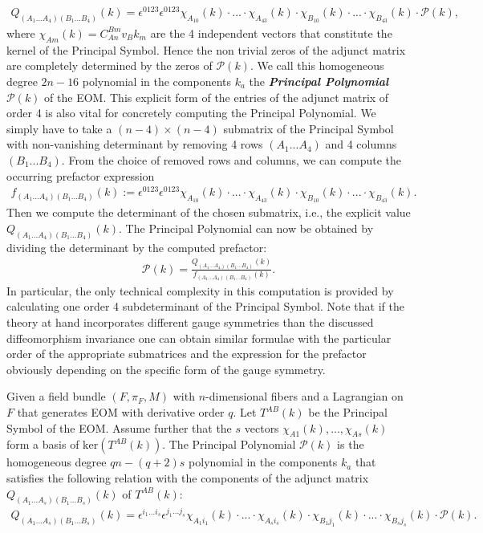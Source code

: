 \begin{align}\label{diffeoMinor}
    Q_{(A_1...A_4) (B_1...B_4)}(k) = \epsilon^{0123} \epsilon^{0123} \chi_{A_10}(k) \cdot ... \cdot \chi_{A_43}(k) \cdot \chi_{B_10}(k) \cdot ... \cdot \chi_{B_43}(k) \cdot \mathcal{P}(k),
\end{align}
% 
%
%
%
where $\chi_{Am}(k) = C^{Bm}_{An} v_B k_m$ are the 4 independent vectors that constitute the kernel of the Principal Symbol. Hence the non trivial zeros of the adjunct matrix are completely determined by the zeros of $\mathcal{P}(k)$. We call this homogeneous degree $2n-16$ polynomial in the components $k_a$ the \textit{\textbf{Principal Polynomial}}  $\mathcal{P}(k)$ of the EOM.
This explicit form of the entries of the adjunct matrix of order 4 is also vital for concretely computing the Principal Polynomial. We simply have to take a $(n-4) \times (n-4)$ submatrix of the Principal Symbol with non-vanishing determinant by removing 4 rows $(A_1...A_4)$ and 4 columns $(B_1...B_4)$. From the choice of removed rows and columns, we can compute the occurring prefactor expression 
\begin{align}\label{prefacF}
f_{(A_1...A_4)(B_1...B_4)}(k) := \epsilon^{0123} \epsilon^{0123} \chi_{A_10}(k) \cdot ... \cdot \chi_{A_43}(k) \cdot \chi_{B_10}(k) \cdot ... \cdot \chi_{B_43}(k).
\end{align}
Then we compute the determinant of the chosen submatrix, i.e., the explicit value $Q_{(A_1...A_4)(B_1...B_4)}(k)$. The Principal Polynomial can now be obtained by dividing the determinant by the computed prefactor:
\begin{align}
    \mathcal{P}(k) = \frac{Q_{(A_1...A_4)(B_1...B_4)}(k)}{f_{(A_1...A_4)(B_1...B_4)}(k)}.
\end{align}
In particular, the only technical complexity in this computation is provided by calculating one order 4 subdeterminant of the Principal Symbol. 
Note that if the theory at hand incorporates different gauge symmetries than the discussed diffeomorphism invariance one can obtain similar formulae with the particular order of the appropriate submatrices and the expression for the prefactor obviously depending on the specific form of the gauge symmetry.
\begin{definition}
Given a field bundle $(F,\pi_F,M)$ with $n$-dimensional fibers and a Lagrangian on $F$ that generates EOM with derivative order $q$. Let  $T^{AB}(k)$ be the Principal Symbol of the EOM. Assume further that the $s$ vectors $\chi_{A1}(k),...,\chi_{As}(k)$ form a basis of $\mathrm{ker}(T^{AB}(k))$. The Principal Polynomial $\mathcal{P}(k)$
is the homogeneous degree $qn - (q+2)s$ polynomial in the components $k_a$ that satisfies the following relation with the components of the adjunct matrix $Q_{(A_1...A_s)(B_1...B_s)}(k)$ of $T^{AB}(k)$:
\begin{align}
   Q_{(A_1...A_s)(B_1...B_s)}(k) = \epsilon^{i_1...i_s} \epsilon^{j_1...j_s} \chi_{A_1i_1}(k)\cdot ... \cdot \chi_{A_si_s}(k) \cdot \chi_{B_1j_1}(k) \cdot ... \cdot \chi_{B_sj_s}(k) \cdot \mathcal{P}(k).
\end{align}
\end{definition}
